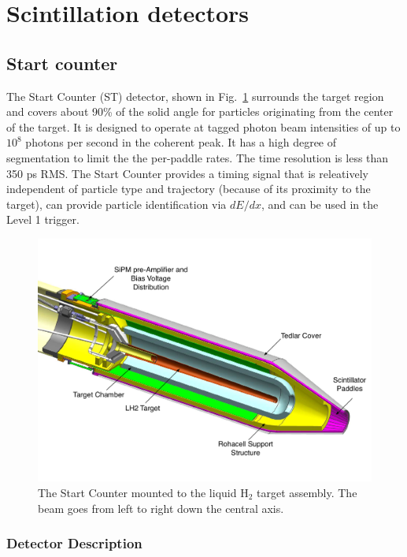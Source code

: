 \section[Scintillation detectors (Mark I./Beni)]{Scintillation detectors \label{sec:scintillators}}
\subsection{Start counter \label{sec:st}}

The Start Counter (ST) detector, shown in Fig.~\ref{fig:st-overview-drawing}
surrounds the target
region and covers about 90\% of the solid angle for particles
originating from the center of the target. It is designed to operate
at tagged photon beam intensities of up to $10^8$ photons per second
in the coherent peak. It has a high degree of segmentation to limit
the the per-paddle rates. The time resolution is less than 350 ps
RMS. The Start Counter provides a timing signal that is releatively
independent of particle type and trajectory (because of its proximity
to the target), can provide particle identification via $dE/dx$, and
can be used in the Level 1 trigger.

\begin{figure}[!htb]
\centering
\includegraphics[width=1.0\columnwidth]{figures/start_counter_all.pdf}
\caption{The \gx{} Start Counter mounted to the liquid $\mathrm{H_2}$
  target assembly.  The beam goes from left to right down the central
  axis.\label{fig:st-overview-drawing}}
\end{figure}

\subsubsection{Detector Description}

